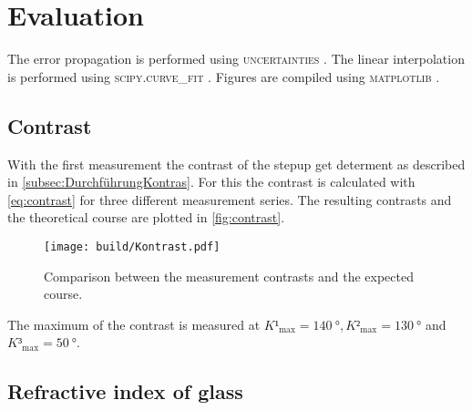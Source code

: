\section{Evaluation}
\label{sec:auswertung}


The error propagation is performed using  \textsc{uncertainties} \cite{uncertainties}. The linear interpolation is performed using \textsc{scipy.curve\_fit} \cite{scipy}.
Figures are compiled using \textsc{matplotlib} \cite{matplotlib}. 
%

\subsection{Contrast}

With the first measurement the contrast of the stepup get determent as described in \autoref{subsec:DurchführungKontras}.
For this the contrast is calculated with \autoref{eq:contrast} for three different measurement series. 
The resulting contrasts and the theoretical course are plotted in \autoref{fig:contrast}.

\begin{figure}[H]
    \centering
    \texttt{[image: build/Kontrast.pdf]}
    \caption{Comparison between the measurement contrasts and the expected course.}
    \label{fig:contrast}
\end{figure}

The maximum of the contrast is measured at $K¹_{\text{max}} = \SI{140}{\degree},K²_{\text{max}} = \SI{130}{\degree}$ and $K³_{\text{max}} = \SI{50}{\degree}$.

\subsection{Refractive index of glass}


